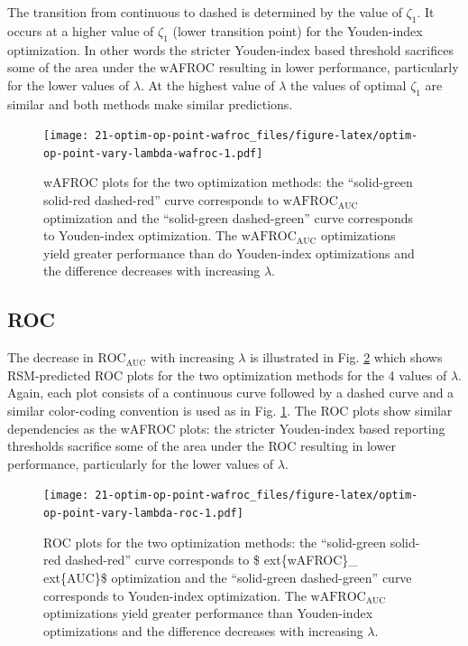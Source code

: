 \documentclass[
]{book}
\begin{document}
The transition from continuous to dashed is determined by the value of \(\zeta_1\). It occurs at a higher value of \(\zeta_1\) (lower transition point) for the Youden-index optimization. In other words the stricter Youden-index based threshold sacrifices some of the area under the wAFROC resulting in lower performance, particularly for the lower values of \(\lambda\). At the highest value of \(\lambda\) the values of optimal \(\zeta_1\) are similar and both methods make similar predictions.

\begin{figure}
\centering
\texttt{[image: 21-optim-op-point-wafroc\_files/figure-latex/optim-op-point-vary-lambda-wafroc-1.pdf]}
\caption{\label{fig:optim-op-point-vary-lambda-wafroc}wAFROC plots for the two optimization methods: the ``solid-green solid-red dashed-red'' curve corresponds to \(\text{wAFROC}_\text{AUC}\) optimization and the ``solid-green dashed-green'' curve corresponds to Youden-index optimization. The \(\text{wAFROC}_\text{AUC}\) optimizations yield greater performance than do Youden-index optimizations and the difference decreases with increasing \(\lambda\).}
\end{figure}

\hypertarget{roc-1}{%
\subsection{ROC}\label{roc-1}}

The decrease in \(\text{ROC}_\text{AUC}\) with increasing \(\lambda\) is illustrated in Fig. \ref{fig:optim-op-point-vary-lambda-roc} which shows RSM-predicted ROC plots for the two optimization methods for the 4 values of \(\lambda\). Again, each plot consists of a continuous curve followed by a dashed curve and a similar color-coding convention is used as in Fig. \ref{fig:optim-op-point-vary-lambda-wafroc}. The ROC plots show similar dependencies as the wAFROC plots: the stricter Youden-index based reporting thresholds sacrifice some of the area under the ROC resulting in lower performance, particularly for the lower values of \(\lambda\).

\begin{figure}
\centering
\texttt{[image: 21-optim-op-point-wafroc\_files/figure-latex/optim-op-point-vary-lambda-roc-1.pdf]}
\caption{\label{fig:optim-op-point-vary-lambda-roc}ROC plots for the two optimization methods: the ``solid-green solid-red dashed-red'' curve corresponds to \$ ext\{wAFROC\}\_ ext\{AUC\}\$ optimization and the ``solid-green dashed-green'' curve corresponds to Youden-index optimization. The \(\text{wAFROC}_\text{AUC}\) optimizations yield greater performance than Youden-index optimizations and the difference decreases with increasing \(\lambda\).}
\end{figure}
\end{document}

